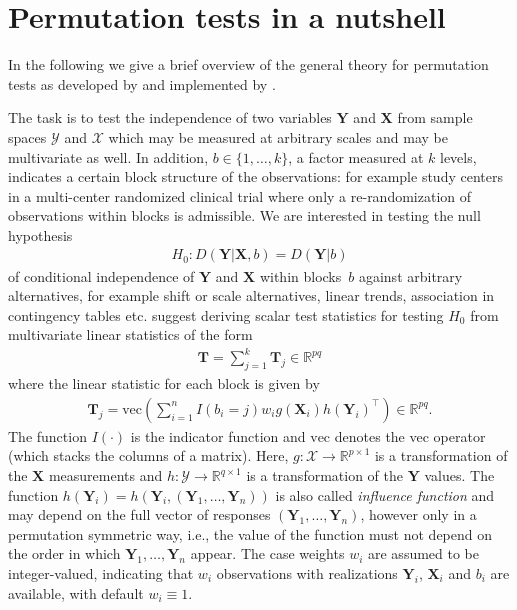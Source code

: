 \documentclass[article]{jss}
\newcommand{\R}{\mathbb{R} }
\newcommand{\X}{\mathbf{X}}
\newcommand{\Y}{\mathbf{Y}}
\newcommand{\T}{\mathbf{T}}
\renewcommand{\vec}{\text{vec}}
\begin{document}
\section{Permutation tests in a nutshell} \label{sec:theory}

In the following we give a brief overview of the general theory for permutation tests
as developed by \cite{StrasserWeber1999} and implemented by \cite{Hothorn:2006:AmStat}.

The task is to test the independence of two variables $\Y$ and $\X$ 
from sample spaces $\mathcal{Y}$ and $\mathcal{X}$ which may
be measured at arbitrary scales and may be multivariate as well.
In addition, $b \in \{1, \dots, k\}$, a factor measured at $k$ levels, indicates a certain block
structure of the observations: for example study centers in a
multi-center randomized clinical trial where only a re-randomization of observations within blocks
is admissible. 
We are interested in testing the null hypothesis
\begin{eqnarray*}
  H_0: D(\Y | \X, b) = D(\Y | b)
\end{eqnarray*}
of conditional independence of $\Y$ and $\X$ within blocks~$b$ against
arbitrary alternatives, for example shift or scale alternatives, linear trends,
association in contingency tables etc.
\cite{StrasserWeber1999} suggest deriving 
scalar test statistics for testing $H_0$ from multivariate linear statistics
of the form 
\begin{eqnarray} \label{linstat}
\T =  \sum_{j = 1}^k \T_j \in \R^{pq}
\end{eqnarray}
where the linear statistic for each block is given by
\begin{eqnarray*}
\T_j = \vec\left(\sum_{i = 1}^n I(b_i = j) w_i g(\X_i) h(\Y_i)^\top\right)
\in \R^{pq}.
\end{eqnarray*}
The function $I(\cdot)$ is the indicator function and $\vec$
denotes the vec operator (which stacks the columns of a matrix).  
Here, $g: \mathcal{X} \rightarrow \R^{p \times 1}$ is a transformation of
the $\X$ measurements and $h: \mathcal{Y} \rightarrow
\R^{q \times 1}$ is a transformation of the $\Y$ values. The function $h(\Y_i)
= h(\Y_i, (\Y_1, \dots, \Y_n))$ is also called \emph{influence function} and
may depend on the full vector of responses
$(\Y_1, \dots, \Y_n)$, however only 
in a permutation symmetric way, i.e., the value of the
function must not depend on the order in which $\Y_1, \dots, \Y_n$ appear.
The case weights $w_i$ are assumed to be integer-valued, indicating
that $w_i$ observations with realizations $\Y_i$, $\X_i$ and $b_i$
are available, with default $w_i \equiv 1$.
\end{document}
